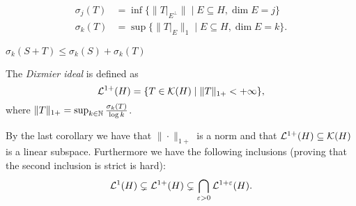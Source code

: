 \begin{lemma}
 \begin{align*}
  \sigma_j(T)&=\inf\{\|T|_{E^\perp}\|\mid E\subseteq H, \dim E=j\}\\
  \sigma_k(T)&=\sup\{\|T|_{E}\|_1\mid E\subseteq H,\dim E=k\}.
 \end{align*}
\end{lemma}
\begin{corollary}
 $\sigma_k(S+T)\leq\sigma_k(S)+\sigma_k(T)$
\end{corollary}

\begin{definition}
 The \emph{Dixmier ideal} is defined as $$\mathcal{L}^{1+}(H)=\{T\in\mathcal{K}(H)\mid\|T\|_{1+}<+\infty\},$$ where $\|T\|_{1+}=\sup_{k\in\mathbb{N}}\frac{\sigma_k(T)}{\log k}$.
\end{definition}

\noindent By the last corollary we have that $\|\cdot\|_{1+}$ is a norm and that $\mathcal{L}^{1+}(H)\subseteq\mathcal{K}(H)$ is a linear subspace. Furthermore we have the following inclusions (proving that the second inclusion is strict is hard):
$$\mathcal{L}^1(H)\subsetneq\mathcal{L}^{1+}(H)\subsetneq\bigcap_{\varepsilon>0}\mathcal{L}^{1+\varepsilon}(H).$$





